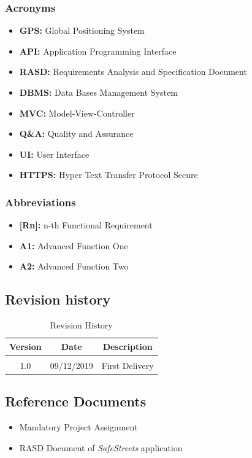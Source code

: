 \documentclass{article}
\begin{document}
	
		\subsubsection{Acronyms}
			\begin{itemize}
				\item {\bf GPS:} Global Positioning System
				\item {\bf API:} Application Programming Interface
				\item {\bf RASD:} Requirements Analysis and Specification Document
				\item {\bf DBMS:} Data Bases Management System
				\item {\bf MVC:} Model-View-Controller
				\item {\bf Q\&A:} Quality and Assurance
				\item {\bf UI:} User Interface
				\item {\bf HTTPS:} Hyper Text Transfer Protocol Secure
			\end{itemize}
		
		\subsubsection{Abbreviations}
			\begin{itemize}
				\item {\bf [Rn]:} n-th Functional Requirement
				\item {\bf A1:} Advanced Function One
				\item {\bf A2:} Advanced Function Two 
			\end{itemize}
	
	
		\subsection{Revision history}
			\begin{table}[ht]
				\centering
				\begin{tabular}{ccc} 
				Version & Date & Description  \\ 
				\hline
		 		\\1.0 & 09/12/2019 & First Delivery
		 		\\
			\end{tabular}
			\caption{Revision History}
			\label{default}
		\end{table}
	
	
		\subsection{Reference Documents}
			\begin{itemize}
				\item Mandatory Project Assignment
				\item RASD Document of {\it SafeStreets} application
			\end{itemize} 
		
\end{document}
